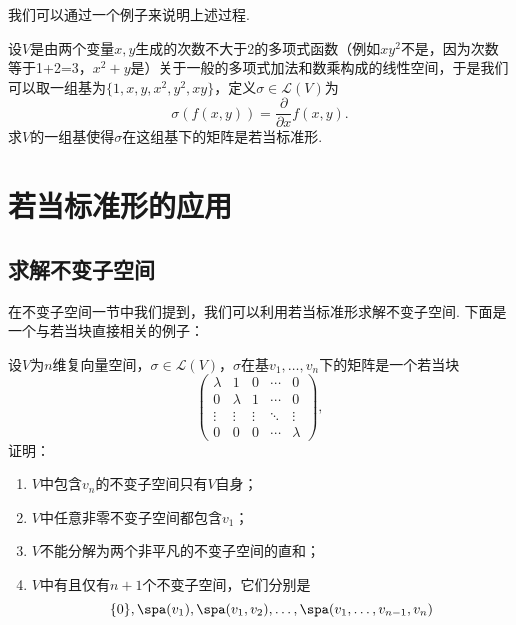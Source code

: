 我们可以通过一个例子来说明上述过程.
\begin{example}{}{}
    设$V$是由两个变量$x,y$生成的次数不大于2的多项式函数（例如$xy^2$不是，因为次数等于1+2=3，$x^2+y$是）关于一般的多项式加法和数乘构成的线性空间，于是我们可以取一组基为$\{1,x,y,x^2,y^2,xy\}$，定义$\sigma\in \mathcal{L}(V)$为
    \[\sigma(f(x,y))=\dfrac{\partial}{\partial x}f(x,y).\]
    求$V$的一组基使得$\sigma$在这组基下的矩阵是若当标准形.
\end{example}
\begin{solution}

\end{solution}

\section{若当标准形的应用}
\subsection{求解不变子空间}
在不变子空间一节中我们提到，我们可以利用若当标准形求解不变子空间. 下面是一个与若当块直接相关的例子：
\begin{example}{}{}
    设$V$为$n$维复向量空间，$\sigma\in \mathcal{L}(V)$，$\sigma$在基$v_1,\ldots,v_n$下的矩阵是一个若当块
    \[\begin{pmatrix}
            \lambda & 1       & 0      & \cdots & 0       \\
            0       & \lambda & 1      & \cdots & 0       \\
            \vdots  & \vdots  & \vdots & \ddots & \vdots  \\
            0       & 0       & 0      & \cdots & \lambda
        \end{pmatrix},\]
    证明：
    \begin{enumerate}
        \item $V$中包含$v_n$的不变子空间只有$V$自身；

        \item $V$中任意非零不变子空间都包含$v_1$；

        \item $V$不能分解为两个非平凡的不变子空间的直和；

        \item $V$中有且仅有$n+1$个不变子空间，它们分别是
              \[\{0\},\spa(v_1),\spa(v_1,v_2),\ldots,\spa(v_1,\ldots,v_{n-1},v_n)\]
    \end{enumerate}
\end{example}

